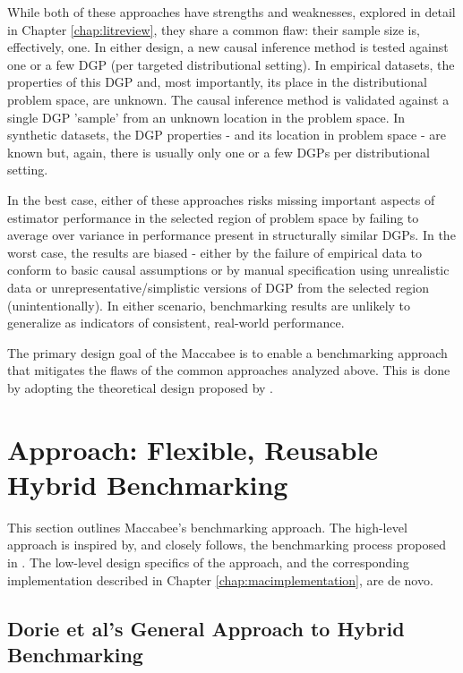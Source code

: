 \documentclass[../main.tex]{subfiles}
\begin{document}
While both of these approaches have strengths and weaknesses, explored in detail in Chapter \ref{chap:litreview}, they share a common flaw: their sample size is, effectively, one. In either design, a new causal inference method is tested against one or a few DGP (per targeted distributional setting). In empirical datasets, the properties of this DGP and, most importantly, its place in the distributional problem space, are unknown. The causal inference method is validated against a single DGP 'sample' from an unknown location in the problem space. In synthetic datasets, the DGP properties - and its location in problem space - are known but, again, there is usually only one or a few DGPs per distributional setting.

\vspace{\baselineskip}

In the best case, either of these approaches risks missing important aspects of estimator performance in the selected region of problem space by failing to average over variance in performance present in structurally similar DGPs. In the worst case, the results are biased - either by the failure of empirical data to conform to basic causal assumptions or by manual specification using unrealistic data or unrepresentative/simplistic versions of DGP from the selected region (unintentionally). In either scenario, benchmarking results are unlikely to generalize as indicators of consistent, real-world performance.

\vspace{\baselineskip}

The primary design goal of the Maccabee is to enable a benchmarking approach that mitigates the flaws of the common approaches analyzed above. This is done by adopting the theoretical design proposed by \textcite{Dorie2019Automated1}.

\section{Approach: Flexible, Reusable Hybrid Benchmarking}
\label{mac:approach}

This section outlines Maccabee's benchmarking approach. The high-level approach is inspired by, and closely follows, the benchmarking process proposed in \textcite{Dorie2019Automated1}. The low-level design specifics of the approach, and the corresponding implementation described in Chapter \ref{chap:macimplementation}, are de novo.

\subsection{Dorie et al's General Approach to Hybrid Benchmarking}
\label{mac:generalapproach}
\end{document}
